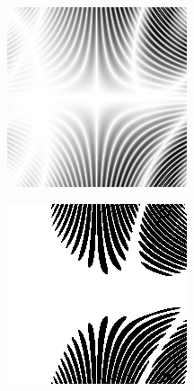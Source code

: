 \documentclass[a4paper,12pt,notitlepage]{article}
\begin{document}
			\begin{figure}[H]
				\centering
				\begin{subfigure}[b]{0.4\textwidth}
					\centering
					\includegraphics[width=\textwidth]{chris/image6}
					\caption{}
				\end{subfigure}
				\begin{subfigure}[b]{0.4\textwidth}
					\centering
					\includegraphics[width=\textwidth]{chris/image7}

\end{subfigure}
\end{figure}
\end{document}

